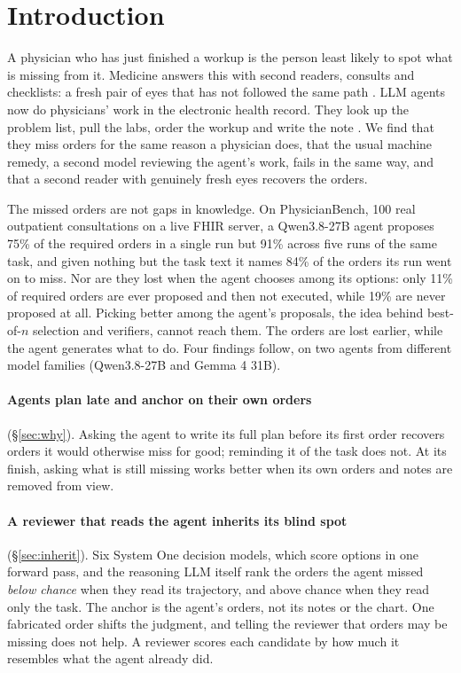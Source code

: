 \documentclass[11pt]{article}
\begin{document}
\section{Introduction}

A physician who has just finished a workup is the person least likely to spot what is missing from it. Medicine
answers this with second readers, consults and checklists: a fresh pair of eyes that has not followed the same path
\citep{croskerry2003cognitive,haynes2009checklist}. LLM agents now do physicians' work in the electronic health record.
They look up the problem list, pull the labs, order the workup and write the note \citep{physicianbench2026,yao2023react}.
We find that they miss orders for the same reason a physician does, that the usual machine remedy, a second model
reviewing the agent's work, fails in the same way, and that a second reader with genuinely fresh eyes recovers the
orders.

The missed orders are not gaps in knowledge. On PhysicianBench, 100 real outpatient consultations on a live FHIR
server, a Qwen3.8-27B agent proposes 75\% of the required orders in a single run but 91\% across five runs of the same
task, and given nothing but the task text it names 84\% of the orders its run went on to miss. Nor are they lost when
the agent chooses among its options: only 11\% of required orders are ever proposed and then not executed, while 19\%
are never proposed at all. Picking better among the agent's proposals, the idea behind best-of-$n$ selection and
verifiers, cannot reach them. The orders are lost earlier, while the agent generates what to do. Four findings follow,
on two agents from different model families (Qwen3.8-27B and Gemma 4 31B).

\paragraph{Agents plan late and anchor on their own orders} (\S\ref{sec:why}). Asking the agent to write its full
plan before its first order recovers orders it would otherwise miss for good; reminding it of the task does not. At
its finish, asking what is still missing works better when its own orders and notes are removed from view.

\paragraph{A reviewer that reads the agent inherits its blind spot} (\S\ref{sec:inherit}). Six System One decision
models, which score options in one forward pass, and the reasoning LLM itself rank the orders the agent missed
\emph{below chance} when they read its trajectory, and above chance when they read only the task. The anchor is the
agent's orders, not its notes or the chart. One fabricated order shifts the judgment, and telling the reviewer that
orders may be missing does not help. A reviewer scores each candidate by how much it resembles what the agent already
did.
\end{document}
